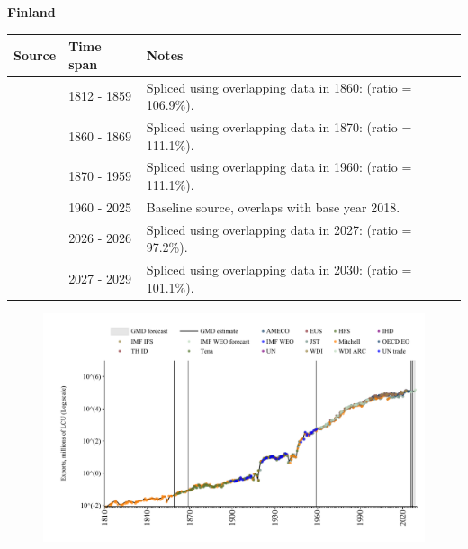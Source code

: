 \documentclass[12pt,a4paper,landscape]{article}
\begin{document}
\begin{adjustbox}{max totalsize={\paperwidth}{\paperheight},center}
\begin{minipage}[t][\textheight][t]{\textwidth}
\vspace*{0.5cm}
{}
\begin{center}
{\Large\bfseries Finland}
\end{center}
\vspace{0.5cm}
\begin{table}[H]
\centering
\small
\begin{tabular}{|l|l|l|}
\hline
\textbf{Source} & \textbf{Time span} & \textbf{Notes} \\
\hline
\rowcolor{white}\cite{Mitchell}& 1812 - 1859 &Spliced using overlapping data in 1860: (ratio = 106.9\%).\\
\rowcolor{lightgray}\cite{Tena}& 1860 - 1869 &Spliced using overlapping data in 1870: (ratio = 111.1\%).\\
\rowcolor{white}\cite{JST}& 1870 - 1959 &Spliced using overlapping data in 1960: (ratio = 111.1\%).\\
\rowcolor{lightgray}\cite{OECD_EO}& 1960 - 2025 &Baseline source, overlaps with base year 2018.\\
\rowcolor{white}\cite{AMECO}& 2026 - 2026 &Spliced using overlapping data in 2027: (ratio = 97.2\%).\\
\rowcolor{lightgray}\cite{IMF_WEO_forecast}& 2027 - 2029 &Spliced using overlapping data in 2030: (ratio = 101.1\%).\\
\hline
\end{tabular}
\end{table}
\begin{figure}[H]
\centering
\includegraphics[width=\textwidth,height=0.6\textheight,keepaspectratio]{graphs/FIN_exports.pdf}
\end{figure}
\end{minipage}
\end{adjustbox}
\end{document}
